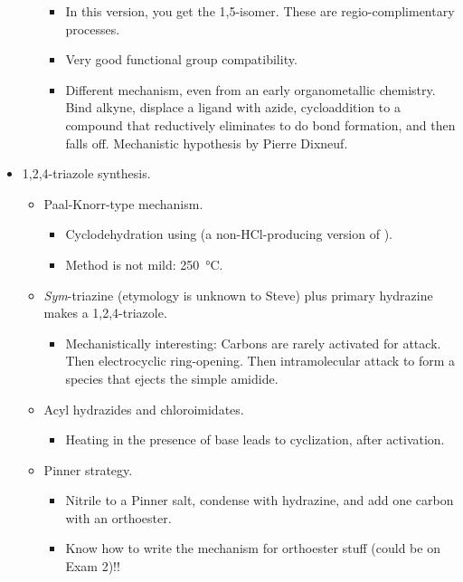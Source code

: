 \documentclass[../notes.tex]{subfiles}
\begin{document}
\begin{itemize}
\begin{itemize}
\begin{itemize}
            \item In this version, you get the 1,5-isomer. These are regio-complimentary processes.
            \item Very good functional group compatibility.
            \item Different mechanism, even from an early organometallic chemistry. Bind alkyne, displace a ligand with azide, cycloaddition to a compound that reductively eliminates to do  bond formation, and then falls off. Mechanistic hypothesis by Pierre Dixneuf.
        \end{itemize}
    \end{itemize}
    \item 1,2,4-triazole synthesis.
    \begin{itemize}
        \item Paal-Knorr-type mechanism.
        \begin{itemize}
            \item Cyclodehydration using  (a non-HCl-producing version of ).
            \item Method is not mild: \SI{250}{\celsius}.
        \end{itemize}
        \item \emph{Sym}-triazine (etymology is unknown to Steve) plus primary hydrazine makes a 1,2,4-triazole.
        \begin{itemize}
            \item Mechanistically interesting: Carbons are rarely activated for attack. Then electrocyclic ring-opening. Then intramolecular attack to form a species that ejects the simple amidide.
        \end{itemize}
        \item Acyl hydrazides and chloroimidates.
        \begin{itemize}
            \item Heating in the presence of base leads to cyclization, after activation.
        \end{itemize}
        \item Pinner strategy.
        \begin{itemize}
            \item Nitrile to a Pinner salt, condense with hydrazine, and add one carbon with an orthoester.
            \item Know how to write the mechanism for orthoester stuff (could be on Exam 2)!!
        \end{itemize}
    \end{itemize}

\end{itemize}
\end{document}
